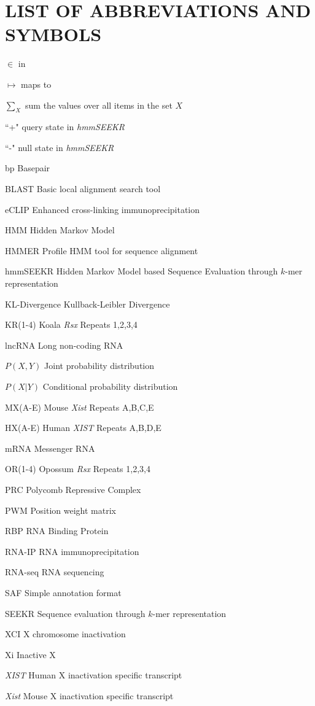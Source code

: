 \documentclass[11pt,letterpaper,oneside]{report}
\newenvironment{abbreviations}{\begin{list}{}{\renewcommand{\makelabel}{\abbrlabel}}}{\end{list}}
\newcommand{\abbrlabel}[1]{\makebox[3cm][l]{\textbf{#1}\ \dotfill}}
\begin{document}
\chapter*{LIST OF ABBREVIATIONS AND SYMBOLS}
\begin{abbreviations}
\item [$\in$] in
\item [$\mapsto$] maps to
\item [$\sum_X$] sum the values over all items in the set $X$
\item [``+"] query state in \emph{hmmSEEKR}
\item [``-"] null state in \textit{hmmSEEKR}
\item [bp] Basepair
\item [BLAST] Basic local alignment search tool

\item [eCLIP] Enhanced cross-linking immunoprecipitation 
\item [HMM] Hidden Markov Model
\item [HMMER] Profile HMM tool for sequence alignment 
\item[hmmSEEKR] Hidden Markov Model based Sequence Evaluation through $k$-mer representation
\item [KL-Divergence] Kullback-Leibler Divergence
\item [KR(1-4)] Koala \textit{Rsx} Repeats 1,2,3,4
\item [lncRNA] Long non-coding RNA
\item [$P(X,Y)$] Joint probability distribution
\item [$P(X|Y)$] Conditional probability distribution
\item [MX(A-E)] Mouse \textit{Xist} Repeats A,B,C,E
\item [HX(A-E)] Human \textit{XIST} Repeats A,B,D,E
\item [mRNA] Messenger RNA
\item [OR(1-4)] Opossum \textit{Rsx} Repeats 1,2,3,4

\item [PRC] Polycomb Repressive Complex
\item [PWM] Position weight matrix 

\item [RBP] RNA Binding Protein
\item [RNA-IP] RNA immunoprecipitation
\item [RNA-seq] RNA sequencing 
\item [SAF] Simple annotation format
\item [SEEKR] Sequence evaluation through $k$-mer representation
\item [XCI] X chromosome inactivation
\item [Xi] Inactive X
\item [\textit{XIST}] Human X inactivation specific transcript
\item [\textit{Xist}] Mouse X inactivation specific transcript

\end{abbreviations}
\clearpage
\end{document}
